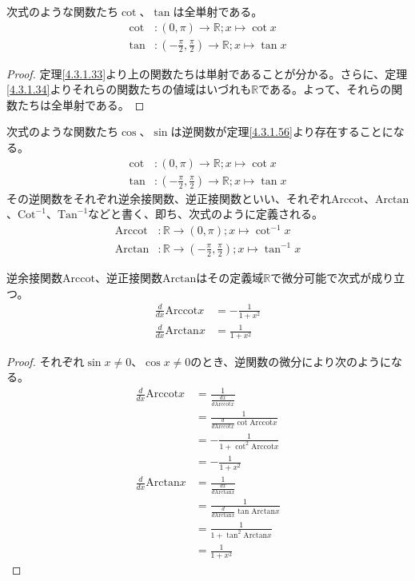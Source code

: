 \documentclass[dvipdfmx]{jsarticle}
\begin{document}
\begin{thm}\label{4.3.1.56} 次式のような関数たち$\cot$、$\tan$は全単射である。
\begin{align*}
\cot&:(0,\pi) \rightarrow \mathbb{R};x \mapsto \cot x\\
\tan&:\left( - \frac{\pi}{2},\frac{\pi}{2} \right) \rightarrow \mathbb{R};x \mapsto \tan x
\end{align*}
\end{thm}
\begin{proof} 定理\ref{4.3.1.33}より上の関数たちは単射であることが分かる。さらに、定理\ref{4.3.1.34}よりそれらの関数たちの値域はいづれも$\mathbb{R}$である。よって、それらの関数たちは全単射である。
\end{proof}
\begin{dfn}
次式のような関数たち$\cos$、$\sin$は逆関数が定理\ref{4.3.1.56}より存在することになる。
\begin{align*}
\cot&:(0,\pi) \rightarrow \mathbb{R};x \mapsto \cot x\\
\tan&:\left( - \frac{\pi}{2},\frac{\pi}{2} \right) \rightarrow \mathbb{R};x \mapsto \tan x
\end{align*}
その逆関数をそれぞれ逆余接関数、逆正接関数といい、それぞれ$\mathrm{Arccot}$、$\mathrm{Arctan}$、${\mathrm{Cot}}^{- 1}$、${\mathrm{Tan}}^{- 1}$などと書く、即ち、次式のように定義される。
\begin{align*}
\mathrm{Arccot}&:\mathbb{R} \rightarrow (0,\pi);x \mapsto \cot^{- 1}x\\
\mathrm{Arctan}&:\mathbb{R} \rightarrow \left( - \frac{\pi}{2},\frac{\pi}{2} \right);x \mapsto \tan^{- 1}x
\end{align*}
\end{dfn}
\begin{thm}\label{4.3.1.57}
逆余接関数$\mathrm{Arccot}$、逆正接関数$\mathrm{Arctan}$はその定義域$\mathbb{R}$で微分可能で次式が成り立つ。
\begin{align*}
\frac{d}{dx}{\mathrm{Arccot}}x &= - \frac{1}{1 + x^{2}}\\
\frac{d}{dx}{\mathrm{Arctan}}x &= \frac{1}{1 + x^{2}}
\end{align*}
\end{thm}
\begin{proof}
それぞれ$\sin x \neq 0$、$\cos x \neq 0$のとき、逆関数の微分により次のようになる。
\begin{align*}
\frac{d}{dx}{\mathrm{Arccot}}x &= \frac{1}{\frac{dx}{d{\mathrm{Arccot}}x}}\\
&= \frac{1}{\frac{d}{d{\mathrm{Arccot}}x}\cot{{\mathrm{Arccot}}x}}\\
&= - \frac{1}{1 + \cot^{2}{{\mathrm{Arccot}}x}}\\
&= - \frac{1}{1 + x^{2}}\\
\frac{d}{dx}{\mathrm{Arctan}}x &= \frac{1}{\frac{dx}{d{\mathrm{Arctan}}x}}\\
&= \frac{1}{\frac{d}{d{\mathrm{Arctan}}x}\tan{{\mathrm{Arctan}}x}}\\
&= \frac{1}{1 + \tan^{2}{{\mathrm{Arctan}}x}}\\
&= \frac{1}{1 + x^{2}}
\end{align*}
\end{proof}
\end{document}
